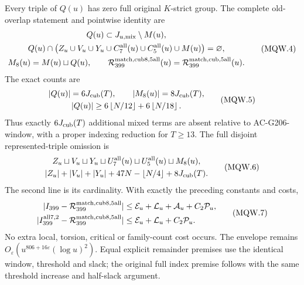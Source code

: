 \begin{theorem}
\label{AC-G208-window}
Every triple of $Q(u)$ has zero full original $K$-strict group.
The complete old-overlap statement and pointwise identity are
\[
 \begin{gathered}
 Q(u)\subset J_{u,\rm mix}\setminus M(u),\\
 Q(u)\cap\bigl(Z_u\cup V_u\cup Y_u\cup C_7^{\rm all}(u)
                              \cup C_5^{\rm all}(u)\cup M(u)\bigr)
                                      =\varnothing,\\
 M_8(u)=M(u)\sqcup Q(u),\qquad
 \mathcal R_{399}^{\rm match,cub8,5all}(u)
                 =\mathcal R_{399}^{\rm match,cub,5all}(u).
 \end{gathered}\tag{MQW.4}
\]
The exact counts are
\[
 \begin{gathered}
 |Q(u)|=6J_{\rm cub}(T),\qquad |M_8(u)|=8J_{\rm cub}(T),\\
 |Q(u)|\geq6\left\lfloor N/12\right\rfloor
                       +6\left\lfloor N/18\right\rfloor.
 \end{gathered}\tag{MQW.5}
\]
Thus exactly $6J_{\rm cub}(T)$ additional mixed terms are absent
relative to AC-G206-window, with a proper indexing reduction
for $T\geq13$. The full disjoint represented-triple omission is
\[
 \begin{gathered}
 Z_u\sqcup V_u\sqcup Y_u\sqcup U_7^{\rm all}(u)
                   \sqcup U_5^{\rm all}(u)\sqcup M_8(u),\\
 |Z_u|+|V_u|+|Y_u|+47N-\lfloor N/4\rfloor+8J_{\rm cub}(T).
 \end{gathered}\tag{MQW.6}
\]
The second line is its cardinality. With exactly the preceding
constants and costs,
\[
 \begin{aligned}
 |I_{399}-\mathcal R_{399}^{\rm match,cub8,5all}|&\leq
          \mathcal E_u+\mathcal L_u+\mathcal A_u+C_2\mathcal P_u,\\
 |I_{399}^{\rm all7,2}-\mathcal R_{399}^{\rm match,cub8,5all}|&\leq
          \mathcal E_u+\mathcal L_u+C_2\mathcal P_u.
 \end{aligned}\tag{MQW.7}
\]
No extra local, torsion, critical or family-count cost occurs.
The envelope remains $O_\varepsilon(u^{806+16\varepsilon}(\log u)^2)$.
Equal explicit remainder premises use the identical window,
threshold and slack; the original full index premise follows
with the same threshold increase and half-slack argument.
\end{theorem}

